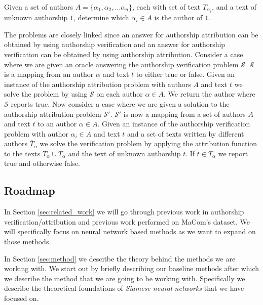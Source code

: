 \begin{definition}

    Given a set of authors $A = \{\alpha_1, \alpha_2,...\alpha_n\}$, each with
    set of text $T_{\alpha_i}$, and a text of unknown authorship \texttt{t},
    determine which $\alpha_i \in A$ is the author of \texttt{t}.

\end{definition}

The problems are closely linked since an answer for authorship attribution
can be obtained by using authorship verification and an answer for authorship
verification can be obtained by using authorship attribution. Consider a case
where we are given an oracle answering the authorship verification problem
$\mathcal{S}$. $\mathcal{S}$ is a mapping from an author $\alpha$ and text $t$
to either true or false. Given an instance of the authorship attribution problem
with authors $A$ and text $t$ we solve the problem by using $\mathcal{S}$ on
each author $\alpha \in A$. We return the author where $\mathcal{S}$ reports
true. Now consider a case where we are given a solution to the authorship
attribution problem $\mathcal{S}'$. $\mathcal{S}'$ is now a mapping from a set
of authors $A$ and text $t$ to an author $\alpha \in A$. Given an instance of
the authorship verification problem with author $\alpha_i \in A$ and text $t$
and a set of texts written by different authors $\overline{T}_{\alpha}$ we solve
the verification problem by applying the attribution function to the texts
$T_{\alpha} \cup \overline{T}_{\alpha}$ and the text of unknown authorship $t$.
If $t \in T_{\alpha}$ we report true and otherwise false.


\subsection{Roadmap}

In Section \ref{sec:related_work} we will go through previous work in authorship
verification/attribution and previous work performed on MaCom's dataset. We will
specifically focus on neural network based methods as we want to expand on those
methods.

In Section \ref{sec:method} we describe the theory behind the methods we are
working with. We start out by briefly describing our baseline methods after
which we describe the method that we are going to be working with. Specifically
we describe the theoretical foundations of \textit{Siamese neural networks} that
we have focused on.

